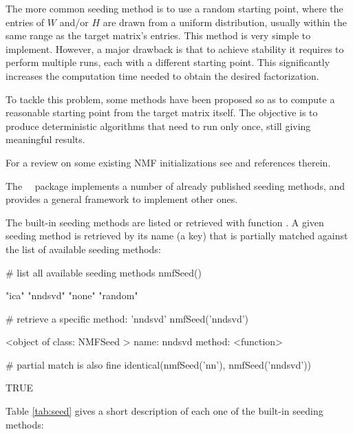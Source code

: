\documentclass[a4paper]{article}
\newcommand{\nmfpack}{\code{NMF}\ }
\begin{document}
The more common seeding method is to use a random starting point, where the entries 
of $W$ and/or $H$ are drawn from a uniform distribution, usually within the same 
range as the target matrix's entries.
This method is very simple to implement.
However, a major drawback is that to achieve stability it requires 
to perform multiple runs, each with a different starting point. 
This significantly increases the computation time needed to obtain the desired 
factorization.

To tackle this problem, some methods have been proposed so as to compute a reasonable
starting point from the target matrix itself. The objective is to produce deterministic 
algorithms that need to run only once, still giving meaningful results.

For a review on some existing NMF initializations see \cite{Albright2006} and 
references therein.

The \nmfpack\ package implements a number of already published seeding methods, 
and provides a general framework to implement other ones.

The built-in seeding methods are listed or retrieved with function . 
A given seeding method is retrieved by its name (a  key) that is 
partially matched against the list of available seeding methods:  

\begin{Schunk}
\begin{Sinput}
 # list all available seeding methods
 nmfSeed()
\end{Sinput}
\begin{Soutput}
[1] "ica"    "nndsvd" "none"   "random"
\end{Soutput}
\begin{Sinput}
 # retrieve a specific method: 'nndsvd' 
 nmfSeed('nndsvd')
\end{Sinput}
\begin{Soutput}
<object of class:  NMFSeed >
name:	 nndsvd 
method:	 <function> 
\end{Soutput}
\begin{Sinput}
 # partial match is also fine
 identical(nmfSeed('nn'), nmfSeed('nndsvd'))
\end{Sinput}
\begin{Soutput}
[1] TRUE
\end{Soutput}
\end{Schunk}

Table \ref{tab:seed} gives a short description of each one of the built-in seeding methods:
\end{document}
